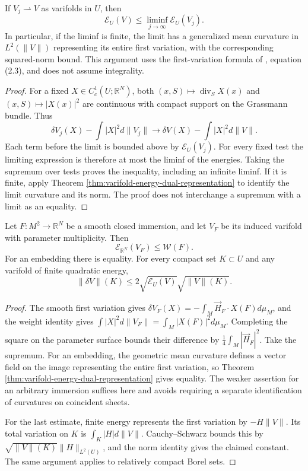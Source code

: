 \begin{theorem}\label{thm:varifold-quadratic-energy-lsc}
If $V_j\rightharpoonup V$ as varifolds in $U$, then
\[
 \mathcal E_U(V)\leq\liminf_{j\to\infty}\mathcal E_U(V_j).
\]
In particular, if the liminf is finite, the limit has a generalized mean curvature in $L^2(\|V\|)$ representing its entire first variation, with the corresponding squared-norm bound. This argument uses the first-variation formula of \cite{Sim18}, equation (2.3), and does not assume integrality.
\end{theorem}
\begin{proof}
For a fixed $X\in C_c^1(U;\mathbb R^N)$, both $(x,S)\mapsto\operatorname{div}_SX(x)$ and $(x,S)\mapsto|X(x)|^2$ are continuous with compact support on the Grassmann bundle. Thus
\[
 \delta V_j(X)-\int|X|^2d\|V_j\|
 \longrightarrow \delta V(X)-\int|X|^2d\|V\|.
\]
Each term before the limit is bounded above by $\mathcal E_U(V_j)$. For every fixed test the limiting expression is therefore at most the liminf of the energies. Taking the supremum over tests proves the inequality, including an infinite liminf. If it is finite, apply Theorem \ref{thm:varifold-energy-dual-representation} to identify the limit curvature and its norm. The proof does not interchange a supremum with a limit as an equality.
\end{proof}

\begin{proposition}\label{prop:smooth-varifold-willmore-comparison}
Let $F:M^2\to\mathbb R^N$ be a smooth closed immersion, and let $V_F$ be its induced varifold with parameter multiplicity. Then
\[
 \mathcal E_{\mathbb R^N}(V_F)\leq\mathcal W(F).
\]
For an embedding there is equality. For every compact set $K\subset U$ and any varifold of finite quadratic energy,
\[
 \|\delta V\|(K)\leq2\sqrt{\mathcal E_U(V)}\sqrt{\|V\|(K)}.
\]
\end{proposition}
\begin{proof}
The smooth first variation gives $\delta V_F(X)=-\int_M\vec H_F\cdot X(F)d\mu_M$, and the weight identity gives $\int|X|^2d\|V_F\|=\int_M|X(F)|^2d\mu_M$. Completing the square on the parameter surface bounds their difference by $\frac14\int_M|\vec H_F|^2$. Take the supremum. For an embedding, the geometric mean curvature defines a vector field on the image representing the entire first variation, so Theorem \ref{thm:varifold-energy-dual-representation} gives equality. The weaker assertion for an arbitrary immersion suffices here and avoids requiring a separate identification of curvatures on coincident sheets.

For the last estimate, finite energy represents the first variation by $-H\|V\|$. Its total variation on $K$ is $\int_K|H|d\|V\|$. Cauchy--Schwarz bounds this by $\sqrt{\|V\|(K)}\|H\|_{L^2(U)}$, and the norm identity gives the claimed constant. The same argument applies to relatively compact Borel sets.
\end{proof}

